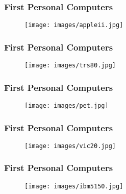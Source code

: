 \documentclass{beamer}
\begin{document}

\begin{frame}
\frametitle{First Personal Computers}

\begin{figure}
\texttt{[image: images/appleii.jpg]}
\end{figure}

\end{frame}


\begin{frame}
\frametitle{First Personal Computers}

\begin{figure}
\texttt{[image: images/trs80.jpg]}
\end{figure}

\end{frame}


\begin{frame}
\frametitle{First Personal Computers}

\begin{figure}
\texttt{[image: images/pet.jpg]}
\end{figure}

\end{frame}


\begin{frame}
\frametitle{First Personal Computers}

\begin{figure}
\texttt{[image: images/vic20.jpg]}
\end{figure}

\end{frame}


\begin{frame}
\frametitle{First Personal Computers}

\begin{figure}
\texttt{[image: images/ibm5150.jpg]}
\end{figure}

\end{frame}
\end{document}
